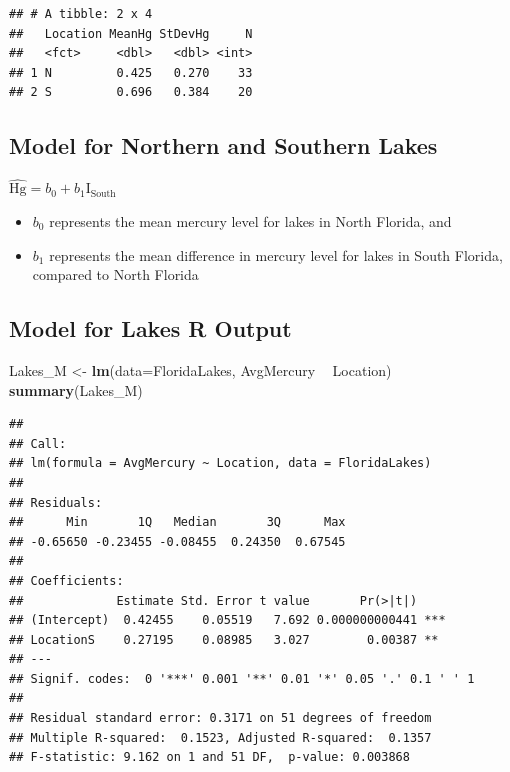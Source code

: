 \documentclass[]{book}
\newenvironment{Shaded}{\begin{snugshade}}{\end{snugshade}}
\newcommand{\KeywordTok}[1]{\textcolor[rgb]{0.13,0.29,0.53}{\textbf{#1}}}
\newcommand{\DataTypeTok}[1]{\textcolor[rgb]{0.13,0.29,0.53}{#1}}
\newcommand{\StringTok}[1]{\textcolor[rgb]{0.31,0.60,0.02}{#1}}
\newcommand{\OperatorTok}[1]{\textcolor[rgb]{0.81,0.36,0.00}{\textbf{#1}}}
\newcommand{\NormalTok}[1]{#1}
\providecommand{\tightlist}{%
  \setlength{\itemsep}{0pt}\setlength{\parskip}{0pt}}
\begin{document}
\begin{verbatim}
## # A tibble: 2 x 4
##   Location MeanHg StDevHg     N
##   <fct>     <dbl>   <dbl> <int>
## 1 N         0.425   0.270    33
## 2 S         0.696   0.384    20
\end{verbatim}

\subsection{Model for Northern and Southern
Lakes}\label{model-for-northern-and-southern-lakes}

\(\widehat{\text{Hg}} = b_0 +b_1\text{I}_{\text{South}}\)

\begin{itemize}
\tightlist
\item
  \(b_0\) represents the mean mercury level for lakes in North Florida,
  and\\
\item
  \(b_1\) represents the mean difference in mercury level for lakes in
  South Florida, compared to North Florida
\end{itemize}

\subsection{Model for Lakes R Output}\label{model-for-lakes-r-output}

\begin{Shaded}
\begin{Highlighting}[]
\NormalTok{Lakes_M <-}\StringTok{ }\KeywordTok{lm}\NormalTok{(}\DataTypeTok{data=}\NormalTok{FloridaLakes, AvgMercury }\OperatorTok{~}\StringTok{ }\NormalTok{Location)}
\KeywordTok{summary}\NormalTok{(Lakes_M)}
\end{Highlighting}
\end{Shaded}

\begin{verbatim}
## 
## Call:
## lm(formula = AvgMercury ~ Location, data = FloridaLakes)
## 
## Residuals:
##      Min       1Q   Median       3Q      Max 
## -0.65650 -0.23455 -0.08455  0.24350  0.67545 
## 
## Coefficients:
##             Estimate Std. Error t value       Pr(>|t|)    
## (Intercept)  0.42455    0.05519   7.692 0.000000000441 ***
## LocationS    0.27195    0.08985   3.027        0.00387 ** 
## ---
## Signif. codes:  0 '***' 0.001 '**' 0.01 '*' 0.05 '.' 0.1 ' ' 1
## 
## Residual standard error: 0.3171 on 51 degrees of freedom
## Multiple R-squared:  0.1523, Adjusted R-squared:  0.1357 
## F-statistic: 9.162 on 1 and 51 DF,  p-value: 0.003868
\end{verbatim}
\end{document}
